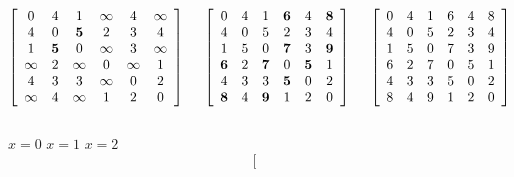 \begin{Boxample}[0]
{\footnotesize
%
\[
\left[
\begin{array}{cccccc} %
0        & 4        & 1        &  \infty  & 4        &  \infty  \\
4        & 0        & \textbf{5}    & 2        & 3        & 4 \\
1        & \textbf{5}    & 0        &  \infty  & 3        &  \infty  \\
 \infty  & 2        &  \infty  & 0        &  \infty  & 1 \\
4        & 3        & 3        &  \infty  & 0        & 2 \\
 \infty  & 4        &  \infty  & 1        & 2        & 0 \\
\end{array}
\right]
\hspace{.5cm}
\left[
\begin{array}{cccccc} %
0        & 4        & 1        & \textbf{6}    & 4     & \textbf{8} \\
4        & 0        & 5        & 2        & 3        & 4 \\
1        & 5        & 0        & \textbf{7}    & 3      & \textbf{9} \\
\textbf{6}    & 2        & \textbf{7}    & 0        & \textbf{5}  & 1 \\
4        & 3        & 3        & \textbf{5}    & 0        & 2 \\
\textbf{8}   & 4        & \textbf{9}    & 1        & 2        & 0 \\
\end{array}
\right]
\hspace{.5cm}
\left[
\begin{array}{cccccc} %
0    & 4   & 1   & 6    & 4    & 8 \\
4    & 0   & 5   & 2    & 3    & 4 \\
1    & 5   & 0   & 7    & 3    & 9 \\
6    & 2   & 7   & 0    & 5    & 1 \\
4    & 3   & 3   & 5    & 0    & 2 \\
8    & 4   & 9   & 1    & 2    & 0 \\
\end{array}
\right]
\]\\[-5pt]
\hspace*{2.25cm}$x = 0$ \hspace{3.45cm} $x = 1$ \hspace{3.1cm} $x = 2$ \\
\[
\left[
\begin{array}{cccccc} %

\end{array}\]}
\end{Boxample}
